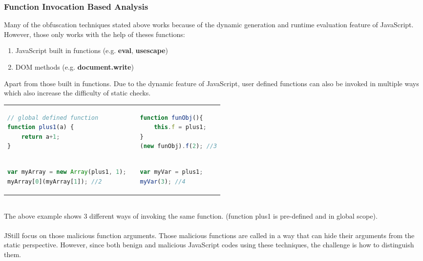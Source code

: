 \subsubsection{Function Invocation Based Analysis} 
Many of the obfuscation techniques stated above works because of the dynamic generation and runtime evaluation feature of JavaScript. However, those only works with the help of theses functions:
\begin{enumerate}
	\item JavaScript built in functions (e.g. \textbf{eval}, \textbf{usescape})
	\item DOM methods (e.g. \textbf{document.write})
\end{enumerate}
Apart from those built in functions. Due to the dynamic feature of JavaScript, user defined functions can also be invoked in multiple ways which also increase the difficulty of static checks. \\
	\begin{tabular}{p{7cm}p{0.5cm}p{7cm}}
			\begin{lstlisting}[language=JavaScript, title=(function plus1)]
// global defined function
function plus1(a) {
	return a+1;
}
			\end{lstlisting} & & \begin{lstlisting}[language=JavaScript, title=(passed as array element)]
function funObj(){
	this.f = plus1;
}
(new funObj).f(2); //3
			\end{lstlisting} \\ 
			\begin{lstlisting}[language=JavaScript, title=(passed as object field)]
var myArray = new Array(plus1, 1);
myArray[0](myArray[1]); //2
			\end{lstlisting}  & & \begin{lstlisting}[language=JavaScript, title=(passed as variable)]
var myVar = plus1;
myVar(3); //4
			\end{lstlisting} 
	\end{tabular}  
\\
The above example shows 3 different ways of invoking the same function. (function plus1 is pre-defined and in global scope). \\ \\
JStill\cite{JStill} focus on those malicious function arguments. Those malicious functions are called in a way that can hide their arguments from the static perspective. However, since both benign and malicious JavaScript codes using these techniques, the challenge is how to distinguish them. 
